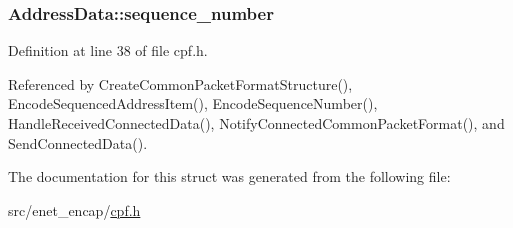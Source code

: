 \hypertarget{structAddressData_a41d4480ab2d89c04cd9211586be88ba5}{
\subsubsection[{sequence\-\_\-number}]{ {\bf \-Address\-Data\-::sequence\-\_\-number}}}\label{d9/da2/structAddressData_a41d4480ab2d89c04cd9211586be88ba5}


\-Definition at line 38 of file cpf.\-h.



\-Referenced by \-Create\-Common\-Packet\-Format\-Structure(), \-Encode\-Sequenced\-Address\-Item(), \-Encode\-Sequence\-Number(), \-Handle\-Received\-Connected\-Data(), \-Notify\-Connected\-Common\-Packet\-Format(), and \-Send\-Connected\-Data().



\-The documentation for this struct was generated from the following file\-:\begin{DoxyCompactItemize}
\item 
src/enet\-\_\-encap/\hyperlink{cpf_8h}{cpf.\-h}\end{DoxyCompactItemize}
